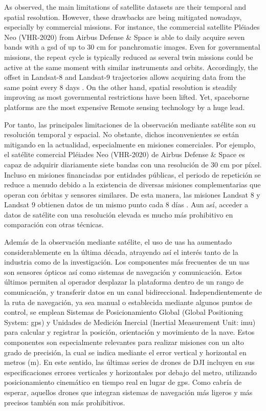 As observed, the main limitations of satellite datasets are their temporal and spatial resolution. However, these drawbacks are being mitigated nowadays, especially by commercial missions. For instance, the commercial satellite Pléiades Neo (VHR-2020) from Airbus Defense \& Space \cite{airbus_pleiades_2021} is able to daily acquire seven bands with a \acrshort{gsd} of up to 30 \si{\centi\meter} for panchromatic images. Even for governmental missions, the repeat cycle is typically reduced as several twin missions could be active at the same moment with similar instruments and orbits. Accordingly, the offset in Landsat-8 and Landsat-9 trajectories allows acquiring data from the same point every 8 days \cite{masek_landsat_2020}. On the other hand, spatial resolution is steadily improving as most governmental restrictions have been lifted. Yet, spaceborne platforms are the most expensive Remote sensing technology by a huge lead. 

Por tanto, las principales limitaciones de la observación mediante satélite son su resolución temporal y espacial. No obstante, dichos inconvenientes se están mitigando en la actualidad, especialmente en misiones comerciales. Por ejemplo, el satélite comercial Pléiades Neo (VHR-2020) de Airbus Defense \& Space \cite{airbus_pleiades_2021} es capaz de adquirir diariamente siete bandas con una resolución de 30 \si{\centi\meter} por píxel. Incluso en misiones financiadas por entidades públicas, el periodo de repetición se reduce a menudo debido a la existencia de diversas misiones complementarias que operan con órbitas y sensores similares. De esta manera, las misiones Landsat 8 y Landsat 9 obtienen datos de un mismo punto cada 8 días \cite{masek_landsat_2020}. Aun así, acceder a datos de satélite con una resolución elevada es mucho más prohibitivo en comparación con otras técnicas.

Además de la observación mediante satélite, el uso de \acrshort{uas} ha aumentado considerablemente en la última década, atrayendo así el interés tanto de la industria como de la investigación. Los componentes más frecuentes de un \acrshort{uas} son sensores ópticos así como sistemas de navegación y comunicación. Estos últimos permiten al operador desplazar la plataforma dentro de un rango de comunicación, y transferir datos en un canal bidireccional. Independientemente de la ruta de navegación, ya sea manual o establecida mediante algunos puntos de control, se emplean Sistemas de Posicionamiento Global (Global Positioning System: \acrshort{gps}) y Unidades de Medición Inercial (Inertial Measurement Unit: \acrshort{imu}) para calcular y registrar la posición, orientación y movimiento de la nave. Estos componentes son especialmente relevantes para realizar misiones con un alto grado de precisión, la cual se indica mediante el error vertical y horizontal en metros (\si{\meter}). En este sentido, las últimas series de drones de DJI incluyen en sus especificaciones errores verticales y horizontales por debajo del metro, utilizando posicionamiento cinemático en tiempo real en lugar de \acrshort{gps}. Como cabría de esperar, aquellos drones que integran sistemas de navegación más ligeros y más precisos también son más prohibitivos.    

